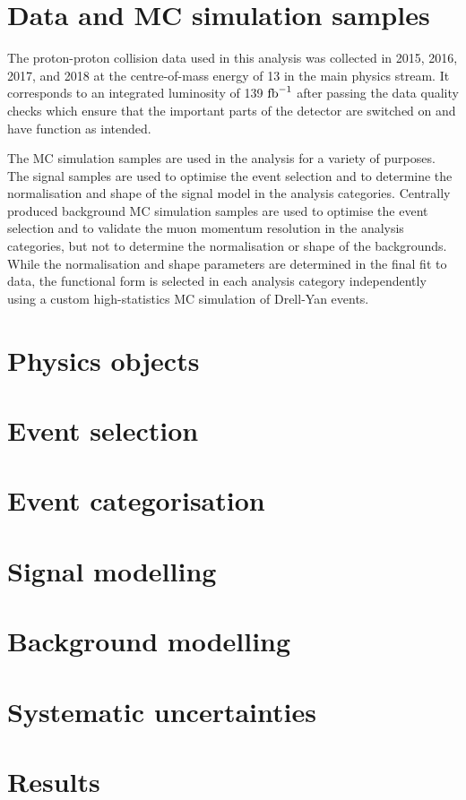 \section{Data and MC simulation samples}

The proton-proton collision data used in this analysis was
collected in 2015, 2016, 2017, and 2018 at the centre-of-mass
energy of 13 \TeV in the main physics stream. It corresponds
to an integrated luminosity of 139 $\text{fb}^{-1}$ after passing the data
quality checks which ensure that the important parts of the
detector are switched on and have function as intended.

The MC simulation samples are used in the analysis for a 
variety of purposes. The signal samples are used to optimise
the event selection and to determine the normalisation and
shape of the signal model in the analysis categories.
Centrally produced background MC simulation samples are used
to optimise the event selection and to validate the muon
momentum resolution in the analysis categories, but not to
determine the normalisation or shape of the backgrounds.
While the normalisation and shape parameters are determined
in the final fit to data, the functional form is selected
in each analysis category independently using a custom
high-statistics MC simulation of Drell-Yan events.



\section{Physics objects}

\section{Event selection}

\section{Event categorisation}

\section{Signal modelling}

\section{Background modelling}

\section{Systematic uncertainties}

\section{Results}


